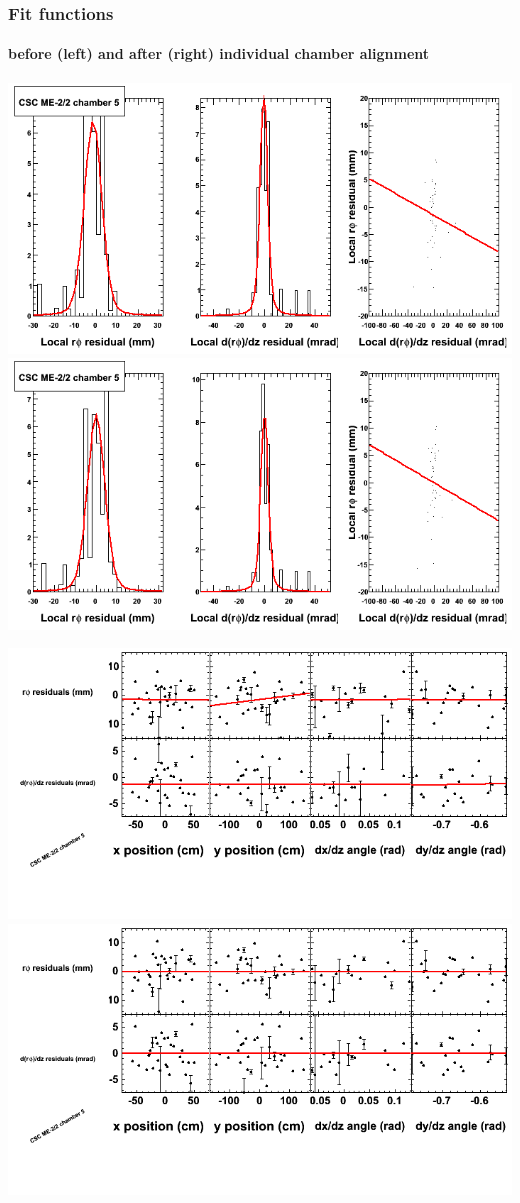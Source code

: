 \documentclass[compress]{beamer}
\begin{document}
\begin{frame}
\frametitle{Fit functions}
\framesubtitle{before (left) and after (right) individual chamber alignment}
\includegraphics[width=0.5\linewidth]{ringfits_3dof/beforefit_MEm22_05_bellcurve.png} \includegraphics[width=0.5\linewidth]{ringfits_3dof/afterfit_MEm22_05_bellcurve.png}

\includegraphics[width=0.5\linewidth]{ringfits_3dof/beforefit_MEm22_05_polynomials.png} \includegraphics[width=0.5\linewidth]{ringfits_3dof/afterfit_MEm22_05_polynomials.png}
\end{frame}
\end{document}
